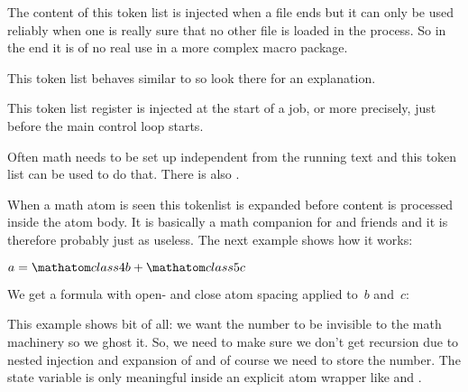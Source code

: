\stopoldprimitive

\startoldprimitive[title={\prm {everyeof}}]

The content of this token list is injected when a file ends but it can only be
used reliably when one is really sure that no other file is loaded in the
process. So in the end it is of no real use in a more complex macro package.

\stopoldprimitive

\startoldprimitive[title={\prm {everyhbox}}]

This token list behaves similar to  so look there for an
explanation.

\stopoldprimitive

\startoldprimitive[title={\prm {everyjob}}]

This token list register is injected at the start of a job, or more precisely,
just before the main control loop starts.

\stopoldprimitive

\startoldprimitive[title={\prm {everymath}}]

Often math needs to be set up independent from the running text and this token
list can be used to do that. There is also .

\stopoldprimitive

\startnewprimitive[title={\prm {everymathatom}}]

When a math atom is seen this tokenlist is expanded before content is processed
inside the atom body. It is basically a math companion for  and
friends and it is therefore probably just as useless. The next example shows how
it works:

\startbuffer
\everymathatom
  {\begingroup
   \scratchcounter\lastatomclass
   \everymathatom{}%
   \endgroup}

$ a = \mathatom class 4 {b} + \mathatom class 5 {c} $
\stopbuffer

\typebuffer

We get a formula with open- and close atom spacing applied to~$b$ and~$c$:

{\getbuffer}

This example shows bit of all: we want the number to be invisible to the math
machinery so we ghost it. So, we need to make sure we don't get recursion due to
nested injection and expansion of  and of course we need to
store the number. The  state variable is only meaningful
inside an explicit atom wrapper like  and .

